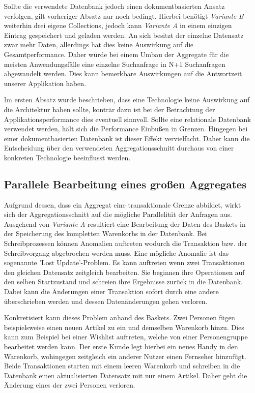 Sollte die verwendete Datenbank jedoch einen dokumentbasierten Ansatz verfolgen, gilt vorheriger Absatz nur noch bedingt. Hierbei benötigt \emph{Variante B} weiterhin drei eigene Collections, jedoch kann \emph{Variante A} in einem einzigen Eintrag gespeichert und geladen werden. An sich besitzt der einzelne Datensatz zwar mehr Daten, allerdings hat dies keine Auswirkung auf die Gesamtperformance. Daher würde bei einem Umbau der Aggregate für die meisten Anwendungsfälle eine einzelne Suchanfrage in N+1 Suchanfragen abgewandelt werden. Dies kann bemerkbare Auswirkungen auf die Antwortzeit unserer Applikation haben.

Im ersten Absatz wurde beschrieben, dass eine Technologie keine Auswirkung auf die Architektur haben sollte, konträr dazu ist bei der Betrachtung der Applikationsperformance dies eventuell sinnvoll. Sollte eine relationale Datenbank verwendet werden, hält sich die Performance Einbußen in Grenzen. Hingegen bei einer dokumentbasierten Datenbank ist dieser Effekt vervielfacht. Daher kann die Entscheidung über den verwendeten Aggregationsschnitt durchaus von einer konkreten Technologie beeinflusst werden. 


\subsection{Parallele Bearbeitung eines großen Aggregates}
Aufgrund dessen, dass ein Aggregat eine transaktionale Grenze abbildet, wirkt sich der Aggregationsschnitt auf die mögliche Parallelität der Anfragen aus. Ausgehend von \emph{Variante A} resultiert eine Bearbeitung der Daten des Baskets in der Speicherung des kompletten Warenkorbs in der Datenbank. Bei Schreibprozessen können Anomalien auftreten wodurch die Transaktion bzw. der Schreibvorgang abgebrochen werden muss. Eine mögliche Anomalie ist das sogenannte 'Lost Update'-Problem. Es kann auftreten wenn zwei Transaktionen den gleichen Datensatz zeitgleich bearbeiten. Sie beginnen ihre Operationen auf den selben Startzustand und schreien ihre Ergebnisse zurück in die Datenbank. Dabei kann die Änderungen einer Transaktion sofort durch eine andere überschrieben werden und dessen Datenänderungen gehen verloren.

Konkretisiert kann dieses Problem anhand des Baskets. Zwei Personen fügen beispielsweise einen neuen Artikel zu ein und demselben Warenkorb hinzu. Dies kann zum Beispiel bei einer Wishlist auftreten, welche von einer Personengruppe bearbeitet werden kann. Der erste Kunde legt hierbei ein neues Handy in den Warenkorb, wohingegen zeitgleich ein anderer Nutzer einen Fernseher hinzufügt. Beide Transaktionen starten mit einem leeren Warenkorb und schreiben in die Datenbank einen aktualisierten Datensatz mit nur einem Artikel. Daher geht die Änderung eines der zwei Personen verloren. 

